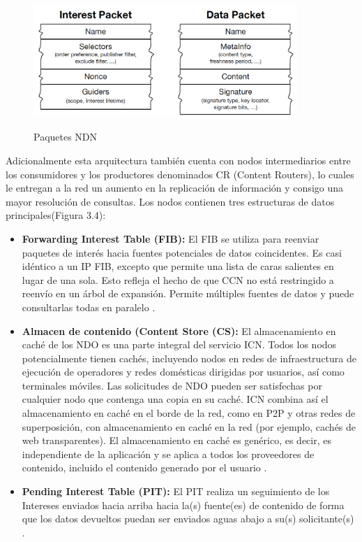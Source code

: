 \documentclass[12pt]{ociamthesis}  %
\begin{document}
\begin{figure}[h]
		\centering
		\includegraphics[width=10cm]{Paquetes_NDN.png}\\
		\caption{Paquetes NDN}
		\label{fig:mesh1}
\end{figure}
 
Adicionalmente esta arquitectura también cuenta con nodos intermediarios entre los consumidores y los productores denominados CR (Content Routers), lo cuales le entregan a la red un aumento en la replicación de información y consigo una mayor resolución de consultas. Los nodos contienen tres estructuras de datos principales(Figura 3.4):

\begin{itemize}
	\item\textbf{Forwarding Interest Table (FIB):} El FIB se utiliza para reenviar paquetes de interés hacia fuentes potenciales de datos coincidentes. Es casi idéntico a un IP FIB, excepto que permite una lista de caras salientes en lugar de una sola. Esto refleja el hecho de que CCN no está restringido a reenvío en un árbol de expansión. Permite múltiples fuentes de datos y puede consultarlas todas en paralelo \cite{jacobson2009networking}.\\
	\item \textbf{Almacen de contenido (Content Store (CS):} El almacenamiento en caché de los NDO es una parte integral del servicio ICN. Todos los nodos potencialmente tienen cachés, incluyendo nodos en redes de infraestructura de ejecución de operadores y redes domésticas dirigidas por usuarios, así como terminales móviles. Las solicitudes de NDO pueden ser satisfechas por cualquier nodo que contenga una copia en su caché. ICN combina así el almacenamiento en caché en el borde de la red, como en P2P y otras redes de superposición, con almacenamiento en caché en la red (por ejemplo, cachés de web transparentes). El almacenamiento en caché es genérico, es decir, es independiente de la aplicación y se aplica a todos los proveedores de contenido, incluido el contenido generado por el usuario \cite{jacobson2009networking}.\\
	\item \textbf{Pending Interest Table (PIT):} El PIT realiza un seguimiento de los Intereses enviados hacia arriba hacia la(s) fuente(es) de contenido de forma que los datos devueltos puedan ser enviados aguas abajo a su(s) solicitante(s) \cite{jacobson2009networking}.\\
\end{itemize}
\end{document}
